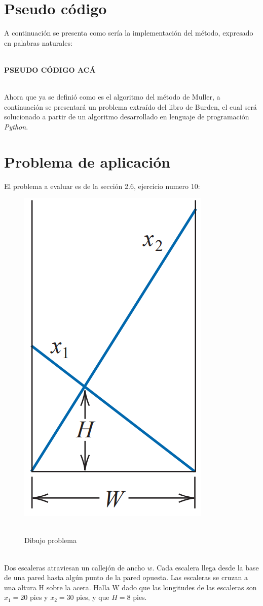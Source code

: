 \documentclass[ceqn,10pt]{SelfArx}
\begin{document}
\section{Pseudo código}
A continuación se presenta como sería la implementación del método,
expresado en palabras naturales:\\\


\textbf{PSEUDO CÓDIGO ACÁ}\\\

Ahora que ya se definió como es el algoritmo del método de Muller, a
continuación se presentará un problema extraído del libro de Burden, el
cual será solucionado a partir de un algoritmo desarrollado en lenguaje de
programación \emph{Python}.
\section{Problema de aplicación}
El problema a evaluar es de la sección 2.6, ejercicio numero
10\cite{burden2017}:
\begin{figure}[ht]\centering
	\includegraphics[scale=0.4]{problema.png}\\\
	\caption{Dibujo problema}
	\label{fig:problema}
\end{figure}
\\Dos escaleras atraviesan un callejón de ancho $w$. Cada escalera llega
desde la base de una pared hasta algún punto de la pared opuesta. Las
escaleras se cruzan a una altura H sobre la acera. Halla W dado que las
longitudes de las escaleras son $x_{1} = 20$ pies y $x_{2} = 30$ pies, y
que $H = 8$ pies.
\end{document}
